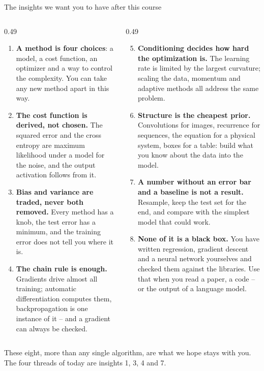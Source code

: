 \documentclass[10pt,aspectratio=169]{beamer}
\newcounter{insight}
\begin{document}
\begin{frame}{The insights we want you to have after this course}
\begin{columns}[T]
\begin{column}{0.49\textwidth}
\footnotesize
\begin{enumerate}
  \item \textbf{A method is four choices}: a model, a cost function, an
    optimizer and a way to control the complexity.  You can take any new
    method apart in this way.
  \item \textbf{The cost function is derived, not chosen.}  The squared
    error and the cross entropy are maximum likelihood under a model for the
    noise, and the output activation follows from it.
  \item \textbf{Bias and variance are traded, never both removed.}  Every
    method has a knob, the test error has a minimum, and the training
    error does not tell you where it is.
  \item \textbf{The chain rule is enough.}  Gradients drive almost all
    training; automatic differentiation computes them, backpropagation is
    one instance of it -- and a gradient can always be checked.
\end{enumerate}
\end{column}
\begin{column}{0.49\textwidth}
\footnotesize
\begin{enumerate}\setcounter{enumi}{4}
  \item \textbf{Conditioning decides how hard the optimization is.}  The
    learning rate is limited by the largest curvature; scaling the data,
    momentum and adaptive methods all address the same problem.
  \item \textbf{Structure is the cheapest prior.}  Convolutions for images,
    recurrence for sequences, the equation for a physical system, boxes for
    a table: build what you know about the data into the model.
  \item \textbf{A number without an error bar and a baseline is not a
    result.}  Resample, keep the test set for the end, and compare with the
    simplest model that could work.
  \item \textbf{None of it is a black box.}  You have written regression,
    gradient descent and a neural network yourselves and checked them
    against the libraries.  Use that when you read a paper, a code -- or
    the output of a language model.
\end{enumerate}
\end{column}
\end{columns}

\medskip
\small\centering
These eight, more than any single algorithm, are what we hope stays with
you.  The four threads of today are insights 1, 3, 4 and 7.
\end{frame}
\end{document}
